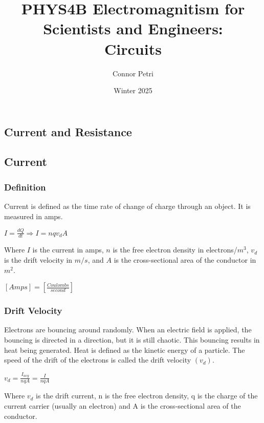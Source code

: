 \documentclass[12pt]{article}
\title{
    PHYS4B Electromagnitism for Scientists and Engineers:\\
    \vspace{12pt}
    Circuits
}
\author{Connor Petri}
\date{Winter 2025}
\begin{document}
\maketitle
\tableofcontents
\pagebreak



\begin{center}
\section{Current and Resistance}
\hrulefill
\subsection*{Current}
\end{center}

\subsubsection*{Definition}
\hspace{.5cm} Current is defined as the time rate of change of charge through an object. It is measured in amps.

\vbox{
    \large\center
    $I=\frac{dQ}{dt} \Rightarrow I = nqv_dA$
}\vspace{12pt}

Where $I$ is the current in amps, $n$ is the free electron density in electrons/$m^3$, 
$v_d$ is the drift velocity in $m/s$, and $A$ is the cross-sectional area of the conductor in $m^2$.

\vbox {
    \large\center
    $[Amps] = [\frac{Coulombs}{second}]$
}


\subsubsection*{Drift Velocity}
Electrons are bouncing around randomly. When an electric field is applied, the bouncing is directed 
in a direction, but it is still chaotic. This bouncing results in heat being generated. Heat is defined 
as the kinetic energy of a particle. The speed of the drift of the electrons is called the drift velocity $(v_d)$.

\vbox{
    \large\center
    $v_d = \frac{I_{avg}}{nqA} = \frac{I}{nqA}$\\
}\vspace{12pt}

Where $v_d$ is the drift current, n is the free electron density, q is the charge of the current carrier 
(usually an electron) and A is the cross-sectional area of the conductor.
\end{document}
